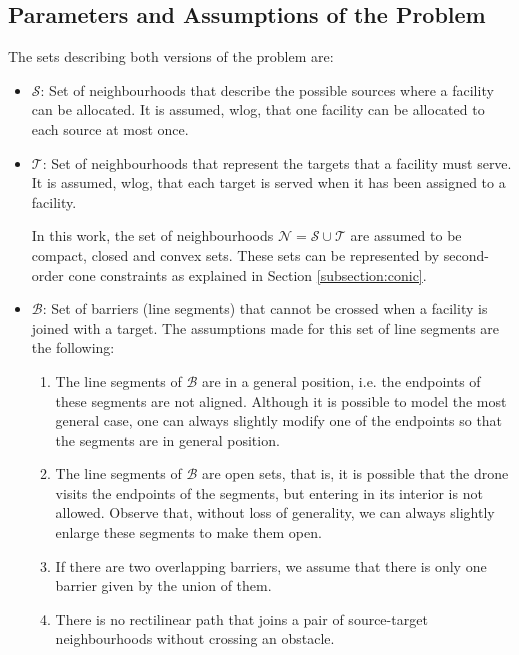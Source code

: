 \documentclass[a4paper,  review, authoryear, 1p.]{elsarticle}
\begin{document}
	\subsection{Parameters and Assumptions of the Problem}
	The sets describing both versions of the problem are:
	\begin{itemize}
		\item $\mathcal S$: Set of neighbourhoods that describe the possible sources where a facility can be allocated. It is assumed, wlog, that one facility can be allocated to each source at most once.
		\item $\mathcal T$: Set of neighbourhoods that represent the targets that a facility must serve. It is assumed, wlog, that each target is served when it has been assigned to a facility.
		
		In this work, the set of neighbourhoods $\mathcal N=\mathcal S\cup\mathcal T$ are assumed to be compact, closed and convex sets. These sets can be represented by second-order cone constraints as explained in Section \ref{subsection:conic}.

		\item $\mathcal B$: Set of barriers (line segments) that cannot be crossed when a facility is joined with a target. The assumptions made for this set of line segments are the following:
		
		\begin{enumerate}[label=\textbf{A\arabic*},ref=\textbf{A\arabic*}]
			\item \label{A1}The line segments of $\mathcal B$ are in a general position, i.e. the endpoints of these segments are not aligned. Although it is possible to model the most general case, one can always slightly modify one of the endpoints so that the segments are in general position.
			\item The line segments of $\mathcal B$ are open sets, that is, it is possible that the drone visits the endpoints of the segments, but entering in its interior is not allowed. Observe that, without loss of generality, we can always slightly enlarge these segments to make them open.
			\item  If there are two overlapping barriers, we assume that there is only one barrier given by the union of them.
			\item \label{A4}There is no rectilinear path that joins a pair of source-target neighbourhoods without crossing an obstacle.
		\end{enumerate}
		
	\end{itemize}
	
\end{document}

